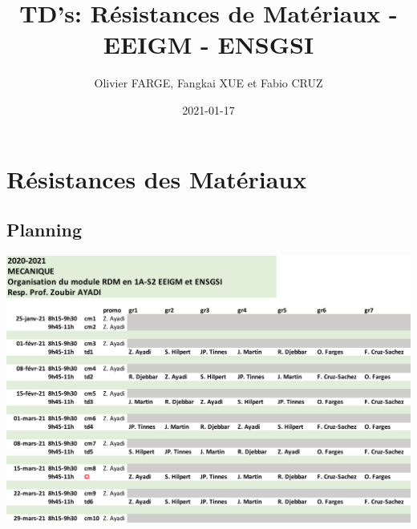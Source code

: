 \documentclass[
]{book}
\title{TD's: Résistances de Matériaux - EEIGM - ENSGSI}
\author{Olivier FARGE, Fangkai XUE et Fabio CRUZ}
\date{2021-01-17}
\begin{document}
\maketitle

{
\setcounter{tocdepth}{1}
\tableofcontents
}
\hypertarget{ruxe9sistances-des-matuxe9riaux}{%
\chapter*{Résistances des Matériaux}\label{ruxe9sistances-des-matuxe9riaux}}

\hypertarget{planning}{%
\section*{Planning}\label{planning}}

\begin{center}\includegraphics[width=600pt]{Figures/Organization-01} \end{center}
\end{document}
